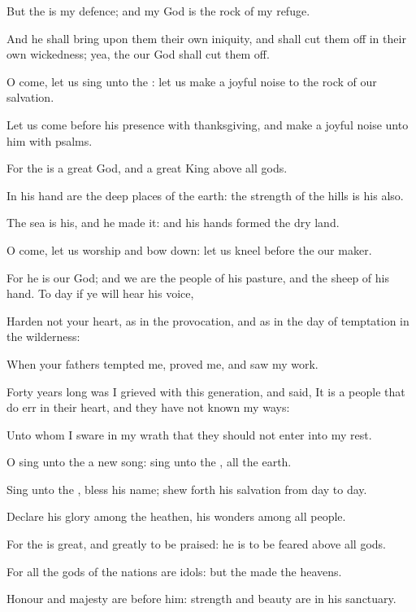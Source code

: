 \Verse But the \LORD is my defence; and my God is the rock of my refuge.

\Verse And he shall bring upon them their own iniquity, and shall cut them off in their own wickedness; yea, the \LORD our God shall cut them off.




\Chapter
\Verse O come, let us sing unto the \LORD: let us make a joyful noise to the rock of our salvation.

\Verse Let us come before his presence with thanksgiving, and make a joyful noise unto him with psalms.

\Verse For the \LORD is a great God, and a great King above all gods.

\Verse In his hand are the deep places of the earth: the strength of the hills is his also.

\Verse The sea is his, and he made it: and his hands formed the dry land.

\Verse O come, let us worship and bow down: let us kneel before the \LORD our maker.

\Verse For he is our God; and we are the people of his pasture, and the sheep of his hand. To day if ye will hear his voice,

\Verse Harden not your heart, as in the provocation, and as in the day of temptation in the wilderness:

\Verse When your fathers tempted me, proved me, and saw my work.

\Verse Forty years long was I grieved with this generation, and said, It is a people that do err in their heart, and they have not known my ways:

\Verse Unto whom I sware in my wrath that they should not enter into my rest.




\Chapter
\Verse O sing unto the \LORD a new song: sing unto the \LORD, all the earth.

\Verse Sing unto the \LORD, bless his name; shew forth his salvation from day to day.

\Verse Declare his glory among the heathen, his wonders among all people.

\Verse For the \LORD is great, and greatly to be praised: he is to be feared above all gods.

\Verse For all the gods of the nations are idols: but the \LORD made the heavens.

\Verse Honour and majesty are before him: strength and beauty are in his sanctuary.

